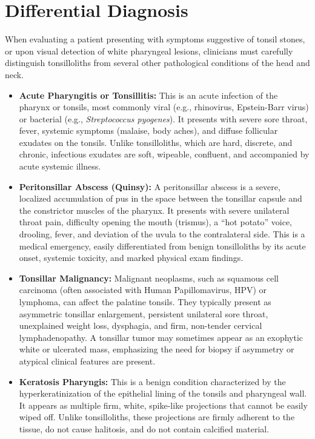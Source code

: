 \section*{Differential Diagnosis}
When evaluating a patient presenting with symptoms suggestive of tonsil stones, or upon visual detection of white pharyngeal lesions, clinicians must carefully distinguish tonsilloliths from several other pathological conditions of the head and neck.
\begin{itemize}
    \item \textbf{Acute Pharyngitis or Tonsillitis:} This is an acute infection of the pharynx or tonsils, most commonly viral (e.g., rhinovirus, Epstein-Barr virus) or bacterial (e.g., \textit{Streptococcus pyogenes}). It presents with severe sore throat, fever, systemic symptoms (malaise, body aches), and diffuse follicular exudates on the tonsils. Unlike tonsilloliths, which are hard, discrete, and chronic, infectious exudates are soft, wipeable, confluent, and accompanied by acute systemic illness.
    \item \textbf{Peritonsillar Abscess (Quinsy):} A peritonsillar abscess is a severe, localized accumulation of pus in the space between the tonsillar capsule and the constrictor muscles of the pharynx. It presents with severe unilateral throat pain, difficulty opening the mouth (trismus), a ``hot potato'' voice, drooling, fever, and deviation of the uvula to the contralateral side. This is a medical emergency, easily differentiated from benign tonsilloliths by its acute onset, systemic toxicity, and marked physical exam findings.
    \item \textbf{Tonsillar Malignancy:} Malignant neoplasms, such as squamous cell carcinoma (often associated with Human Papillomavirus, HPV) or lymphoma, can affect the palatine tonsils. They typically present as asymmetric tonsillar enlargement, persistent unilateral sore throat, unexplained weight loss, dysphagia, and firm, non-tender cervical lymphadenopathy. A tonsillar tumor may sometimes appear as an exophytic white or ulcerated mass, emphasizing the need for biopsy if asymmetry or atypical clinical features are present.
    \item \textbf{Keratosis Pharyngis:} This is a benign condition characterized by the hyperkeratinization of the epithelial lining of the tonsils and pharyngeal wall. It appears as multiple firm, white, spike-like projections that cannot be easily wiped off. Unlike tonsilloliths, these projections are firmly adherent to the tissue, do not cause halitosis, and do not contain calcified material.

\end{itemize}
